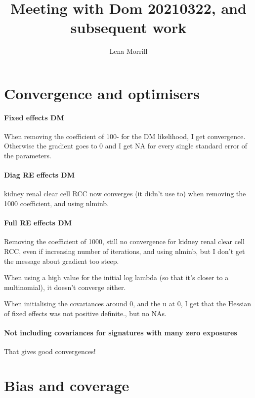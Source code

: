 \documentclass{article}
\title{Meeting with Dom 20210322, and subsequent work}
\author{Lena Morrill}
\begin{document}
\maketitle

\tableofcontents

\section{Convergence and optimisers}

\paragraph{Fixed effects DM} When removing the coefficient of 100- for the DM likelihood, I get convergence. Otherwise the gradient goes to 0 and I get NA for every single standard error of the parameters.

\paragraph{Diag RE effects DM} kidney renal clear cell RCC now converges (it didn't use to) when removing the 1000 coefficient, and using nlminb.

\paragraph{Full RE effects DM} Removing the coefficient of 1000, still no convergence for kidney renal clear cell RCC, even if increasing number of iterations, and using nlminb, but I don't get the message about gradient too steep.

When using a high value for the initial log lambda (so that it's closer to a multinomial), it doesn't converge either.

When initialising the covariances around 0, and the u at 0, I get that the Hessian of fixed effects was not positive definite., but no NAs.

\paragraph{Not including covariances for signatures with many zero exposures} That gives good convergences!

\clearpage
\section{Bias and coverage}
\end{document}
